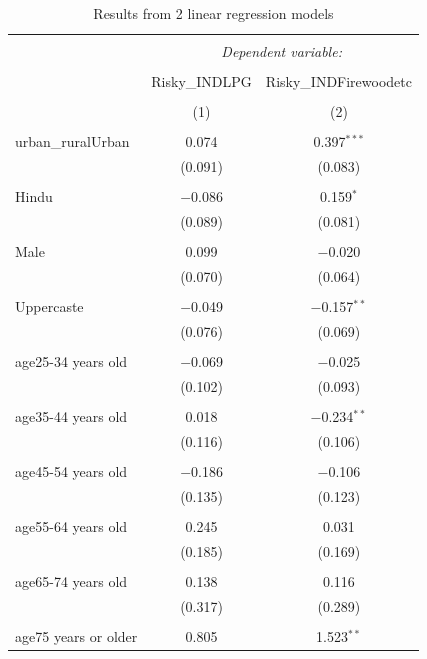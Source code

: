 \documentclass[
]{article}
\begin{document}
\begin{table}[!htbp] \centering 
  \caption{Results from 2 linear regression models} 
  \label{} 
\begin{tabular}{@{\extracolsep{5pt}}lcc} 
\\[-1.8ex]\hline 
\hline \\[-1.8ex] 
 & \multicolumn{2}{c}{\textit{Dependent variable:}} \\ 
\cline{2-3} 
\\[-1.8ex] & Risky\_INDLPG & Risky\_INDFirewoodetc \\ 
\\[-1.8ex] & (1) & (2)\\ 
\hline \\[-1.8ex] 
 urban\_ruralUrban & 0.074 & 0.397$^{***}$ \\ 
  & (0.091) & (0.083) \\ 
  & & \\ 
 Hindu & $-$0.086 & 0.159$^{*}$ \\ 
  & (0.089) & (0.081) \\ 
  & & \\ 
 Male & 0.099 & $-$0.020 \\ 
  & (0.070) & (0.064) \\ 
  & & \\ 
 Uppercaste & $-$0.049 & $-$0.157$^{**}$ \\ 
  & (0.076) & (0.069) \\ 
  & & \\ 
 age25-34 years old & $-$0.069 & $-$0.025 \\ 
  & (0.102) & (0.093) \\ 
  & & \\ 
 age35-44 years old & 0.018 & $-$0.234$^{**}$ \\ 
  & (0.116) & (0.106) \\ 
  & & \\ 
 age45-54 years old & $-$0.186 & $-$0.106 \\ 
  & (0.135) & (0.123) \\ 
  & & \\ 
 age55-64 years old & 0.245 & 0.031 \\ 
  & (0.185) & (0.169) \\ 
  & & \\ 
 age65-74 years old & 0.138 & 0.116 \\ 
  & (0.317) & (0.289) \\ 
  & & \\ 
 age75 years or older & 0.805 & 1.523$^{**}$ \\ 

\end{tabular}
\end{table}
\end{document}

